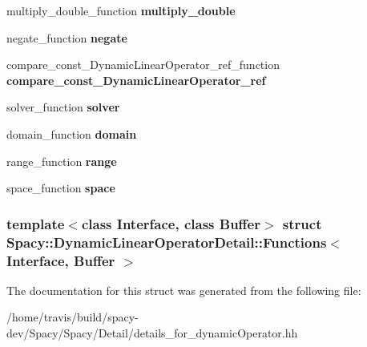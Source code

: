 \begin{DoxyCompactItemize}
\item 
\hypertarget{structSpacy_1_1DynamicLinearOperatorDetail_1_1Functions_a790fb02f6a4a300668a2e056f13e43ea}{multiply\-\_\-double\-\_\-function {\bfseries multiply\-\_\-double}}\label{structSpacy_1_1DynamicLinearOperatorDetail_1_1Functions_a790fb02f6a4a300668a2e056f13e43ea}

\item 
\hypertarget{structSpacy_1_1DynamicLinearOperatorDetail_1_1Functions_a58e5967b3c75c4258ed94756cd2adcf7}{negate\-\_\-function {\bfseries negate}}\label{structSpacy_1_1DynamicLinearOperatorDetail_1_1Functions_a58e5967b3c75c4258ed94756cd2adcf7}

\item 
\hypertarget{structSpacy_1_1DynamicLinearOperatorDetail_1_1Functions_a05e5f10d260d42b5d1376332f21f5c46}{compare\-\_\-const\-\_\-\-Dynamic\-Linear\-Operator\-\_\-ref\-\_\-function {\bfseries compare\-\_\-const\-\_\-\-Dynamic\-Linear\-Operator\-\_\-ref}}\label{structSpacy_1_1DynamicLinearOperatorDetail_1_1Functions_a05e5f10d260d42b5d1376332f21f5c46}

\item 
\hypertarget{structSpacy_1_1DynamicLinearOperatorDetail_1_1Functions_a6aafd6be0893336cf5ddd0286f28c696}{solver\-\_\-function {\bfseries solver}}\label{structSpacy_1_1DynamicLinearOperatorDetail_1_1Functions_a6aafd6be0893336cf5ddd0286f28c696}

\item 
\hypertarget{structSpacy_1_1DynamicLinearOperatorDetail_1_1Functions_a33a583439d89528735aa7156d5456b13}{domain\-\_\-function {\bfseries domain}}\label{structSpacy_1_1DynamicLinearOperatorDetail_1_1Functions_a33a583439d89528735aa7156d5456b13}

\item 
\hypertarget{structSpacy_1_1DynamicLinearOperatorDetail_1_1Functions_a2b68c3c0f83899cb915f66f011a8b5a1}{range\-\_\-function {\bfseries range}}\label{structSpacy_1_1DynamicLinearOperatorDetail_1_1Functions_a2b68c3c0f83899cb915f66f011a8b5a1}

\item 
\hypertarget{structSpacy_1_1DynamicLinearOperatorDetail_1_1Functions_ad6696c24893ac05bb6262355c5eb0e39}{space\-\_\-function {\bfseries space}}\label{structSpacy_1_1DynamicLinearOperatorDetail_1_1Functions_ad6696c24893ac05bb6262355c5eb0e39}

\end{DoxyCompactItemize}
\subsubsection*{template$<$class \-Interface, class \-Buffer$>$ struct Spacy\-::\-Dynamic\-Linear\-Operator\-Detail\-::\-Functions$<$ Interface, Buffer $>$}



\-The documentation for this struct was generated from the following file\-:\begin{DoxyCompactItemize}
\item 
/home/travis/build/spacy-\/dev/\-Spacy/\-Spacy/\-Detail/details\-\_\-for\-\_\-dynamic\-Operator.\-hh\end{DoxyCompactItemize}
